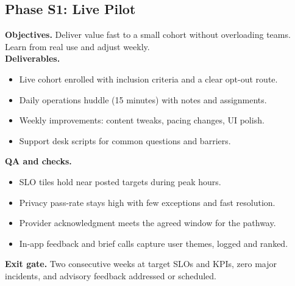 \documentclass[12pt]{article}
\begin{document}
\subsection*{Phase S1: Live Pilot}
\textbf{Objectives.} Deliver value fast to a small cohort without overloading teams. Learn from real use and adjust weekly.\\
\textbf{Deliverables.}
\begin{itemize}[leftmargin=*]
  \item Live cohort enrolled with inclusion criteria and a clear opt-out route.
  \item Daily operations huddle (15 minutes) with notes and assignments.
  \item Weekly improvements: content tweaks, pacing changes, UI polish.
  \item Support desk scripts for common questions and barriers.
\end{itemize}
\textbf{QA and checks.}
\begin{itemize}[leftmargin=*]
  \item SLO tiles hold near posted targets during peak hours.
  \item Privacy pass-rate stays high with few exceptions and fast resolution.
  \item Provider acknowledgment meets the agreed window for the pathway.
  \item In-app feedback and brief calls capture user themes, logged and ranked.
\end{itemize}
\textbf{Exit gate.} Two consecutive weeks at target SLOs and KPIs, zero major incidents, and advisory feedback addressed or scheduled.
\end{document}
